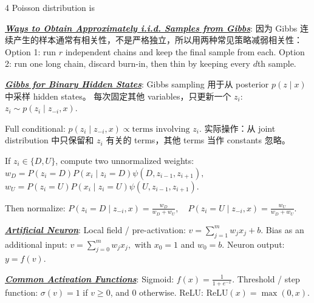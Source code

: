 \documentclass[12pt]{article}
\newcommand{\bulletPoint}[1]{\underline{\textit{\textbf{#1}}}}
\begin{document}
\begin{multicols*}{4}
Poisson distribution is




\bulletPoint{Ways to Obtain Approximately i.i.d. Samples from Gibbs}:
因为 Gibbs 连续产生的样本通常有相关性，不是严格独立，所以用两种常见策略减弱相关性：
Option 1:
run $r$ independent chains and keep the final sample from each.
Option 2:
run one long chain, discard burn-in, then thin by keeping every $d$th sample.


\bulletPoint{Gibbs for Binary Hidden States}:
Gibbs sampling 用于从 posterior $p(z\mid x)$ 中采样 hidden states。
每次固定其他 variables，只更新一个 $z_i$:
$
z_i \sim p(z_i\mid z_{-i},x).
$

Full conditional:
$
p(z_i\mid z_{-i},x)
\propto
\text{terms involving }z_i.
$
实际操作：从 joint distribution 中只保留和 $z_i$ 有关的 terms，其他 terms 当作 constants 忽略。

If $z_i\in\{D,U\}$, compute two unnormalized weights:
$
w_D
=
P(z_i=D)P(x_i\mid z_i=D)
\psi(D,z_{i-1},z_{i+1}),
$
$
w_U
=
P(z_i=U)P(x_i\mid z_i=U)
\psi(U,z_{i-1},z_{i+1}).
$

Then normalize:
$
P(z_i=D\mid z_{-i},x)=\frac{w_D}{w_D+w_U},
\quad
P(z_i=U\mid z_{-i},x)=\frac{w_U}{w_D+w_U}.
$





\bulletPoint{Artificial Neuron}:
Local field / pre-activation:
$v=\sum_{j=1}^m w_jx_j+b.$
Bias as an additional input:
$v=\sum_{j=0}^m w_jx_j,$
with $x_0=1$ and $w_0=b.$
Neuron output:
$y=f(v).$

\bulletPoint{Common Activation Functions}:
Sigmoid:
$f(x)=\frac{1}{1+e^{-x}}.$
Threshold / step function:
$\sigma(v)=1$ if $v\ge 0$, and $0$ otherwise.
ReLU:
$\mathrm{ReLU}(x)=\max(0,x).$


\end{multicols*}
\end{document}
